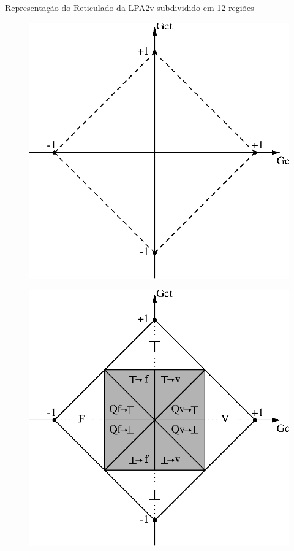 \begin{frame}{\small{Representação do Reticulado da LPA2v subdividido em 12 regiões}}
\vspace{1cm}
\begin{minipage}{0.50\linewidth}
\begin{figure}[!htb]
\center\includegraphics[scale=0.65]{./imagens/C428retasgcgct.eps}
\end{figure}
\end{minipage}
\begin{minipage}{0.45\linewidth}
\begin{figure}[!htb]
\center\includegraphics[scale=0.65]{./imagens/C430gcgct.eps}

\end{figure}
\end{minipage}
\end{frame}
